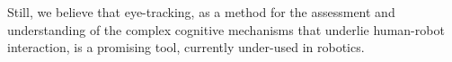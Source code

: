 \documentclass{sig-alternate}
\begin{document}
Still, we believe that eye-tracking, as a method for the assessment and
understanding of the complex cognitive mechanisms that underlie human-robot
interaction, is a promising tool, currently under-used in robotics.



%




\balancecolumns
\end{document}
